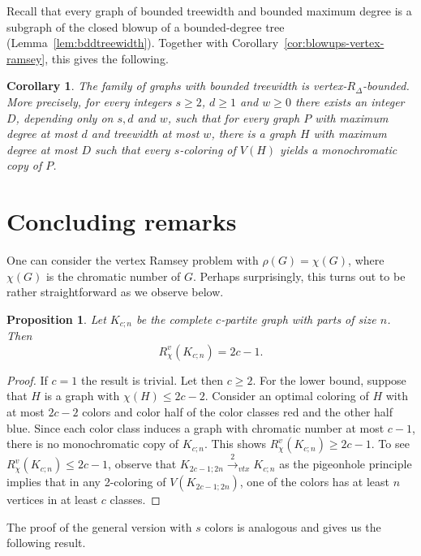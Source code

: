 \documentclass[11pt]{article}
\newtheorem{proposition}[theorem]{Proposition}
\newtheorem{corollary}[theorem]{Corollary}
\theoremstyle{definition}
\begin{document}
Recall that every graph of bounded treewidth and bounded maximum degree is
a subgraph of the closed blowup of a bounded-degree
tree (Lemma~\ref{lem:bddtreewidth}). Together with Corollary~\ref{cor:blowups-vertex-ramsey}, this gives the following.

\begin{corollary}\label{cor:treewidth-vertex-ramsey}
The family of graphs with bounded treewidth is vertex-$R_\Delta$-bounded.
More precisely, for every integers $s \ge 2$,  $d \ge 1$ and $w \ge 0$ there exists an integer $D$, depending only on $s, d$ and $w$, such that for every graph $P$ with maximum degree at most $d$ and treewidth at most $w$, there is a graph $H$ with maximum degree at most $D$ such that every $s$-coloring of $V(H)$ yields a monochromatic copy of $P$.
\end{corollary}



\section{Concluding remarks}
One can consider the vertex Ramsey  problem with $\rho(G)=\chi(G)$, where $\chi(G)$ is the chromatic number of $G$. Perhaps surprisingly, this turns out to be rather straightforward as we observe below.
\begin{proposition} \label{prop:chi}
Let $K_{c;n}$ be the complete $c$-partite graph with parts of size $n$. Then
\[
R_\chi^v(K_{c;n}) = 2c - 1.
\]
\end{proposition}

\begin{proof}
If $c=1$ the result is trivial. Let then $c\ge2$. For the lower bound, suppose that $H$ is a graph with $\chi(H) \le 2c - 2$. Consider an optimal coloring of $H$ with at most $2c-2$ colors and color half of the color classes red and the other half blue. Since each color class induces a graph with chromatic number at most $c-1$, there is no monochromatic copy of $K_{c;n}$. This shows $ R_\chi^v(K_{c;n})\ge 2c-1$.
To see $R_\chi^v(K_{c;n}) \leq 2c - 1$, observe that $K_{2c-1;2n} \xrightarrow{2}_{vtx} K_{c;n}$ 
as the pigeonhole principle implies that in any 2-coloring of $V(K_{2c-1;2n})$, one of the colors has at least  $n$ vertices in at least $c$ classes.\end{proof}

The proof of the general version with $s$ colors is analogous and gives us the following result.
\end{document}
